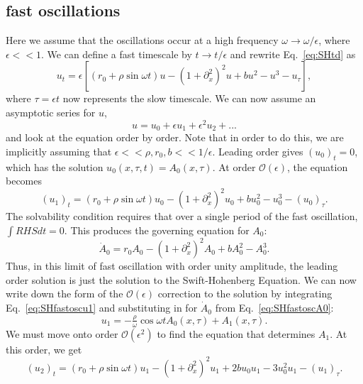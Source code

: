 \documentclass[pre,preprint,superscriptaddress]{revtex4-1}
\begin{document}
\subsection{fast oscillations}
Here we assume that the oscillations occur at a high frequency $\omega\rightarrow\omega/\epsilon$, where $\epsilon<<1$.  We can define a fast timescale by $t\rightarrow t/\epsilon$ and rewrite Eq.~\ref{eq:SHtd} as
\begin{equation}
u_t= \epsilon\left[(r_0+ \rho \sin\omega t) u-\left(1+\partial_{x}^2\right)^2u+b u^2-u^3 -u_{\tau}\right]\label{eq:SH},
\end{equation}
where $\tau=\epsilon t$ now represents the slow timescale.  We can now assume an asymptotic series for $u$,
\begin{equation}
u=u_0+\epsilon u_1+ \epsilon^2 u_2+ ...
\end{equation}
and look at the equation order by order.  Note that in order to do this, we are implicitly assuming that $\epsilon<<\rho,r_0,b<<1/\epsilon$.    Leading order gives $(u_0)_t=0$, which has the solution $u_0(x,\tau,t)=A_0(x,\tau)$.
At order $\mathcal{O}(\epsilon)$, the equation becomes
\begin{equation}
(u_1)_t= (r_0+ \rho \sin\omega t) u_0-\left(1+\partial_{x}^2\right)^2u_0+ b u_0^2-u_0^3 -(u_0)_{\tau}\label{eq:SHfastoscu1}.
\end{equation}
The solvability condition requires that over a single period of the fast oscillation, $\int RHS dt=0$. This produces the governing equation for $A_0$:
\begin{equation}
\dot{A}_0= r_0 A_0-\left(1+\partial_{x}^2\right)^2A_0+b A_0^2-A_0^3\label{eq:SHfastoscA0}.
\end{equation}
Thus, in this limit of fast oscillation with order unity amplitude, the leading order solution is just the solution to the Swift-Hohenberg Equation.
We can now write down the form of the $\mathcal{O}(\epsilon)$ correction to the solution by integrating Eq.~\ref{eq:SHfastoscu1} and substituting in for $\dot{A}_0$ from Eq.~\ref{eq:SHfastoscA0}:
\begin{equation}
u_1=  -\tfrac{\rho}{\omega} \cos\omega t A_0(x,\tau) +A_1(x,\tau)\label{eq:SH}.
\end{equation}
 We must move onto order $\mathcal{O}(\epsilon^2)$ to find the equation that determines $A_1$.  At this order, we get
\begin{equation}
(u_2)_t= (r_0+ \rho \sin\omega t) u_1-\left(1+\partial_{x}^2\right)^2 u_1+ 2 b u_0 u_1- 3 u_0^2 u_1 -(u_1)_{\tau}\label{eq:SH}.
\end{equation}
\end{document}
